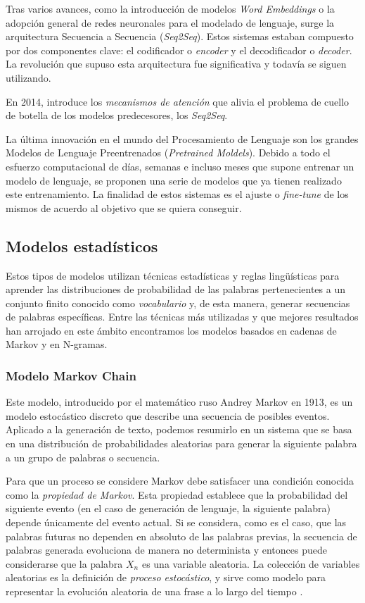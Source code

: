 Tras varios avances, como la introducción de modelos \textit{Word Embeddings} o la adopción general de redes neuronales para el modelado de lenguaje, surge la arquitectura Secuencia a Secuencia (\textit{Seq2Seq}). Estos sistemas estaban compuesto por dos componentes clave: el codificador o \textit{encoder} y el decodificador o \textit{decoder}. La revolución que supuso esta arquitectura fue significativa y todavía se siguen utilizando.

En 2014, \cite{Bahdanau} introduce los \textit{mecanismos de atención} que alivia el problema de cuello de botella de los modelos predecesores, los \textit{Seq2Seq}.

La última innovación en el mundo del Procesamiento de Lenguaje son los grandes Modelos de Lenguaje Preentrenados (\textit{Pretrained Moldels}). Debido a todo el esfuerzo computacional de días, semanas e incluso meses que supone entrenar un modelo de lenguaje, se proponen una serie de modelos que ya tienen realizado este entrenamiento. La finalidad de estos sistemas es el ajuste o \textit{fine-tune} de los mismos de acuerdo al objetivo que se quiera conseguir.

\subsection{Modelos estadísticos}
Estos tipos de modelos utilizan técnicas estadísticas y reglas lingüísticas para aprender las distribuciones de probabilidad de las palabras pertenecientes a un conjunto finito conocido como \textit{vocabulario} y, de esta manera, generar secuencias de palabras específicas. Entre las técnicas más utilizadas y que mejores resultados han arrojado en este ámbito encontramos los modelos basados en cadenas de Markov y en N-gramas.

\subsubsection{Modelo Markov Chain}

Este modelo, introducido por el matemático ruso Andrey Markov en 1913, es un modelo estocástico discreto que describe una secuencia de posibles eventos. Aplicado a la generación de texto, podemos resumirlo en un sistema que se basa en una distribución de probabilidades aleatorias para generar la siguiente palabra a un grupo de palabras o secuencia. 

Para que un proceso se considere Markov debe satisfacer una condición conocida como la \textit{propiedad de Markov}. Esta propiedad establece que la probabilidad del siguiente evento (en el caso de generación de lenguaje, la siguiente palabra) depende únicamente del evento actual. Si se considera, como es el caso, que las palabras futuras no dependen en absoluto de las palabras previas, la secuencia de palabras generada evoluciona de manera no determinista y entonces puede considerarse que la palabra $X_n$ es una variable aleatoria. La colección de variables aleatorias es la definición de \textit{proceso estocástico}, y sirve como modelo para representar la evolución aleatoria de una frase a lo largo del tiempo \citep{MoyotlHernndez2016MtodoPA}.

